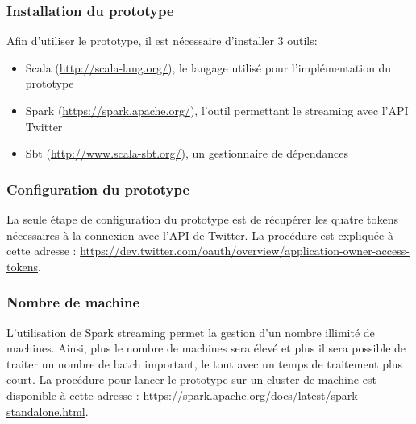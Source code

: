     \subsubsection{Installation du prototype}
      Afin d'utiliser le prototype, il est nécessaire d'installer 3 outils:
      \begin{itemize}
        \item Scala (\url{http://scala-lang.org/}), le langage utilisé pour l'implémentation du prototype
        \item Spark (\url{https://spark.apache.org/}), l'outil permettant le streaming avec l'API Twitter
        \item Sbt (\url{http://www.scala-sbt.org/}), un gestionnaire de dépendances
      \end{itemize}

    \subsubsection{Configuration du prototype}
      La seule étape de configuration du prototype est de récupérer les quatre tokens nécessaires à la connexion avec l'API de Twitter. La procédure est expliquée à cette adresse : \url{https://dev.twitter.com/oauth/overview/application-owner-access-tokens}.

    \subsubsection{Nombre de machine}
      L'utilisation de Spark streaming permet la gestion d'un nombre illimité de machines. Ainsi, plus le nombre de machines sera élevé et plus il sera possible de traiter un nombre de batch important, le tout avec un temps de traitement plus court. La procédure pour lancer le prototype sur un cluster de machine est disponible à cette adresse : \url{https://spark.apache.org/docs/latest/spark-standalone.html}.
